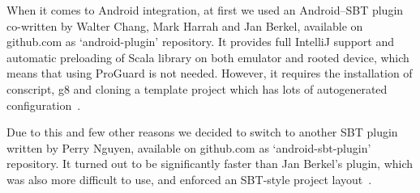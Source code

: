 When it comes to Android integration, at first we used an Android--SBT plugin co-written by Walter Chang, Mark Harrah and Jan Berkel, available on github.com as `android-plugin' repository. It provides full IntelliJ support and automatic preloading of Scala library on both emulator and rooted device, which means that using ProGuard is not needed. However, it requires the installation of conscript, g8 and cloning a template project which has lots of autogenerated configuration~\cite{Nguyen:2013:differences}.

Due to this and few other reasons we decided to switch to another SBT plugin written by Perry Nguyen, available on github.com as `android-sbt-plugin' repository. It turned out to be significantly faster than Jan Berkel's plugin, which was also more difficult to use, and enforced an SBT-style project layout~\cite{Nguyen:2013:differences}.
